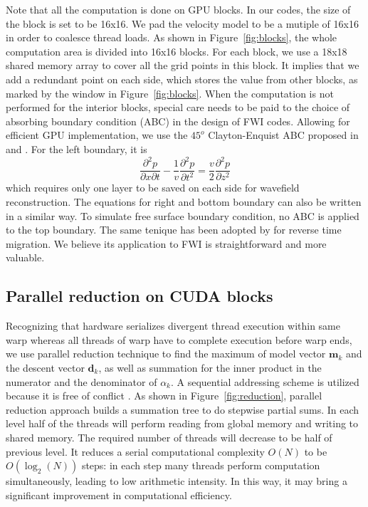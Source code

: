 Note that all the computation is done on GPU blocks. In our codes, the size of the block is set to be 16x16. We pad the velocity model to be a mutiple of 16x16 in order to coalesce thread loads. As shown in Figure~\ref{fig:blocks}, the whole computation area is divided into 16x16 blocks. For each block, we use a 18x18 shared memory array to cover all the grid points in this block. It implies that we add a redundant point on each side, which stores the value from other blocks, as marked by the window in Figure~\ref{fig:blocks}.  When the computation is not performed for the interior blocks, special care needs to be paid to the choice of absorbing boundary condition (ABC) in the design of FWI codes. Allowing for efficient GPU implementation, we use the $45^o$ Clayton-Enquist ABC proposed in \cite{clayton1977absorbing} and \cite{engquist1977absorbing}. For the left boundary, it is
\begin{equation}
 \frac{\partial^2 p}{\partial x\partial t}-\frac{1}{v}\frac{\partial^2 p}{\partial t^2}=\frac{v}{2}\frac{\partial^2 p}{\partial z^2}
\end{equation}
which requires only one layer to be saved on each side for wavefield reconstruction. The equations for right and bottom boundary can also be written in a similar way. To simulate free surface boundary condition, no ABC is applied to the top boundary. The same tenique has been adopted by \cite{liu2013wavefield} for reverse time migration. We believe its application to FWI is straightforward and more valuable.



\subsection{Parallel reduction on CUDA blocks}

Recognizing that  hardware serializes divergent thread execution within same warp whereas all threads of warp have to complete execution before warp ends, we use parallel reduction technique to find the maximum of model vector $\textbf{m}_k$ and the descent vector $\textbf{d}_k$, as well as summation for the inner product in the numerator and the denominator of $\alpha_k$. 
A sequential addressing scheme is utilized because it is free of conflict \citep{harris2007optimizing}. As shown in Figure~\ref{fig:reduction}, parallel reduction approach builds a summation tree to do stepwise partial sums.  In each level half of the threads will perform reading from global memory and writing to shared memory. The required number of threads will decrease to be half of previous level. It reduces a serial computational complexity $O(N)$ to be $O(\log_2(N))$ steps: in each step many threads perform computation simultaneously, leading to low arithmetic intensity. In this way, it may bring a significant improvement in computational efficiency. 

